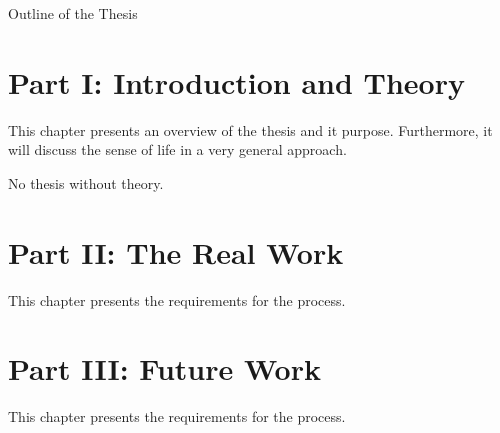 \clearemptydoublepage

{}

\begin{center}
	\huge{Outline of the Thesis}
\end{center}


\section*{Part I: Introduction and Theory}

  \vspace{1mm}

\noindent  This chapter presents an overview of the thesis and it purpose. Furthermore, it will discuss the sense of life in a very general approach.  

  \vspace{1mm}

\noindent  No thesis without theory.   \vspace{1mm}

\section*{Part II: The Real Work}

  \vspace{1mm}

\noindent  This chapter presents the requirements for the process.
\section*{Part III: Future Work}

  \vspace{1mm}

\noindent  This chapter presents the requirements for the process.
